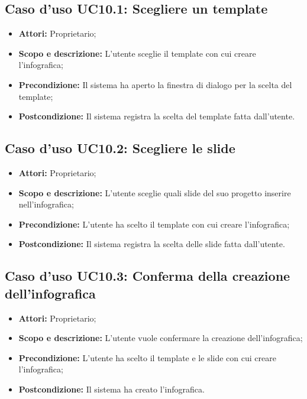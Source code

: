\subsection{Caso d'uso UC10.1: Scegliere un template}
\begin{itemize}
	\item \textbf{Attori:} Proprietario;
	\item \textbf{Scopo e descrizione:} L'utente sceglie il \gls{template} con cui creare l'\gls{infografica};
	\item \textbf{Precondizione:} Il sistema ha aperto la finestra di dialogo per la scelta del \gls{template};
	\item \textbf{Postcondizione:} Il sistema registra la scelta del \gls{template} fatta dall'utente.
\end{itemize}


\subsection{Caso d'uso UC10.2: Scegliere le slide}
\begin{itemize}
\item \textbf{Attori:} Proprietario;
\item \textbf{Scopo e descrizione:} L'utente sceglie quali \gls{slide} del suo progetto inserire nell'\gls{infografica};
\item \textbf{Precondizione:} L'utente ha scelto il \gls{template} con cui creare l'\gls{infografica};
\item \textbf{Postcondizione:} Il sistema registra la scelta delle \gls{slide} fatta dall'utente.
\end{itemize}


\subsection{Caso d'uso UC10.3: Conferma della creazione dell'infografica}
\begin{itemize}
\item \textbf{Attori:} Proprietario;
\item \textbf{Scopo e descrizione:} L'utente vuole confermare la creazione dell'\gls{infografica};
\item \textbf{Precondizione:} L'utente ha scelto il \gls{template} e le \gls{slide} con cui creare l'\gls{infografica};
\item \textbf{Postcondizione:} Il sistema ha creato l'\gls{infografica}.
\end{itemize}

